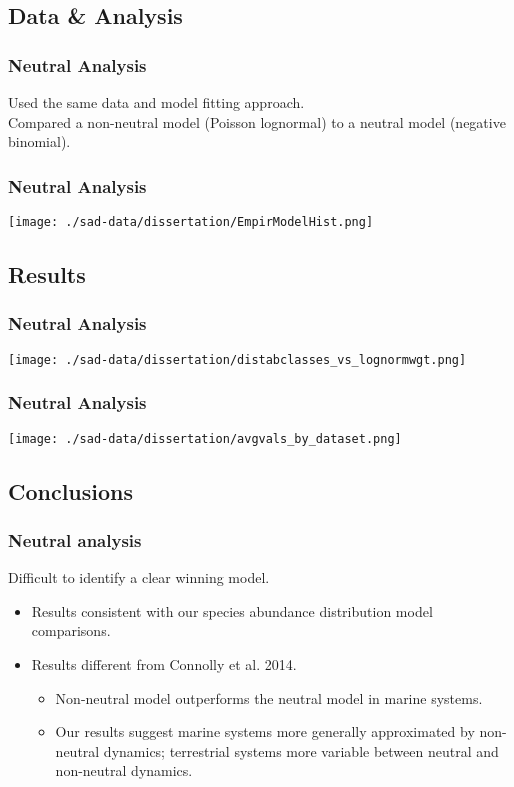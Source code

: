 \documentclass[14pt]{beamer}
\begin{document}
\subsection{Data & Analysis}
\begin{frame}
\frametitle{Neutral Analysis}
Used the same data and model fitting approach.\\
Compared a non-neutral model (Poisson lognormal) to a neutral model (negative binomial).\\
\end{frame}

\begin{frame}{}
\frametitle{Neutral Analysis}
\texttt{[image: ./sad-data/dissertation/EmpirModelHist.png]}
\end{frame}

\subsection{Results}
\begin{frame}{}
\frametitle{Neutral Analysis}
\texttt{[image: ./sad-data/dissertation/distabclasses\_vs\_lognormwgt.png]}
\end{frame}

\begin{frame}{}
\frametitle{Neutral Analysis}
\texttt{[image: ./sad-data/dissertation/avgvals\_by\_dataset.png]}
\end{frame}

\subsection{Conclusions}
\begin{frame}
\frametitle{Neutral analysis}
Difficult to identify a clear winning model.
\begin{itemize}
\item Results consistent with our species abundance distribution model comparisons. 
\item Results different from Connolly et al. 2014.
\begin{itemize}
\item Non-neutral model outperforms the neutral model in marine systems.
\item Our results suggest marine systems more generally approximated by non-neutral dynamics; terrestrial systems more variable between neutral and non-neutral dynamics.
\end{itemize}
\end{itemize}
\end{frame}
\end{document}
